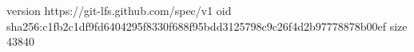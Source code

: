 version https://git-lfs.github.com/spec/v1
oid sha256:c1fb2c1df9fd6404295f8330f688f95bdd3125798c9c26f4d2b97778878b00ef
size 43840
